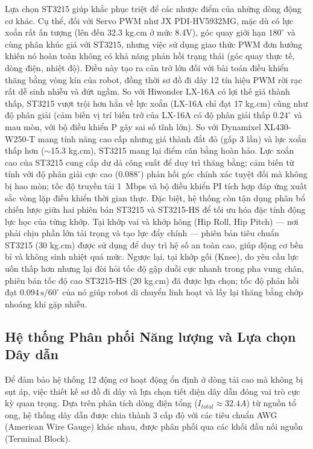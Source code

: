 Lựa chọn ST3215 giúp khắc phục triệt để các nhược điểm của những dòng động cơ khác. Cụ thể, đối với Servo PWM như JX PDI-HV5932MG, mặc dù có lực xoắn rất ấn tượng (lên đến 32.3 kg.cm ở mức 8.4V), góc quay giới hạn $180^{\circ}$ và cùng phân khúc giá với ST3215, nhưng việc sử dụng giao thức PWM đơn hướng khiến nó hoàn toàn không có khả năng phản hồi trạng thái (góc quay thực tế, dòng điện, nhiệt độ). Điều này tạo ra cản trở lớn đối với bài toán điều khiển thăng bằng vòng kín của robot, đồng thời sơ đồ đi dây 12 tín hiệu PWM rời rạc rất dễ sinh nhiễu và đứt ngầm. So với Hiwonder LX-16A có lợi thế giá thành thấp, ST3215 vượt trội hơn hẳn về lực xoắn (LX-16A chỉ đạt 17 kg.cm) cũng như độ phân giải (cảm biến vị trí biến trở của LX-16A có độ phân giải thấp $0.24^{\circ}$ và mau mòn, với bộ điều khiển P gây sai số tĩnh lớn). So với Dynamixel XL430-W250-T mang tính năng cao cấp nhưng giá thành đắt đỏ (gấp 3 lần) và lực xoắn thấp hơn ($\sim$15.3 kg.cm), ST3215 mang lại điểm cân bằng hoàn hảo. Lực xoắn cao của ST3215 cung cấp dư dả công suất để duy trì thăng bằng; cảm biến từ tính với độ phân giải cực cao ($0.088^{\circ}$) phản hồi góc chính xác tuyệt đối mà không bị hao mòn; tốc độ truyền tải 1~Mbps và bộ điều khiển PI tích hợp đáp ứng xuất sắc vòng lặp điều khiển thời gian thực. Đặc biệt, hệ thống còn tận dụng phân bổ chiến lược giữa hai phiên bản ST3215 và ST3215-HS để tối ưu hóa đặc tính động lực học của từng khớp. Tại khớp vai và khớp hông (Hip Roll, Hip Pitch) --- nơi phải chịu phần lớn tải trọng và tạo lực đẩy chính --- phiên bản tiêu chuẩn ST3215 (30 kg.cm) được sử dụng để duy trì hệ số an toàn cao, giúp động cơ bền bỉ và không sinh nhiệt quá mức. Ngược lại, tại khớp gối (Knee), do yêu cầu lực uốn thấp hơn nhưng lại đòi hỏi tốc độ gập duỗi cực nhanh trong pha vung chân, phiên bản tốc độ cao ST3215-HS (20 kg.cm) đã được lựa chọn; tốc độ phản hồi đạt $0.094\,\text{s}/60^{\circ}$ của nó giúp robot di chuyển linh hoạt và lấy lại thăng bằng chớp nhoáng khi gặp nhiễu.

\subsection{Hệ thống Phân phối Năng lượng và Lựa chọn Dây dẫn}

Để đảm bảo hệ thống 12 động cơ hoạt động ổn định ở dòng tải cao mà không bị sụt áp, việc thiết kế sơ đồ đi dây và lựa chọn tiết diện dây dẫn đóng vai trò cực kỳ quan trọng. Dựa trên phân tích dòng điện tổng ($I_{total} \approx 32.4A$) từ nguồn tổ ong, hệ thống dây dẫn được chia thành 3 cấp độ với các tiêu chuẩn AWG (American Wire Gauge) khác nhau, được phân phối qua các khối đầu nối nguồn (Terminal Block).

